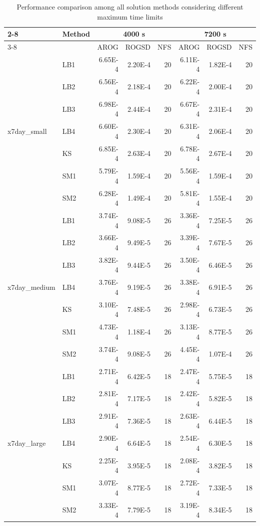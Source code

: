 \begin{table}[htpb]
\centering
\caption{Performance comparison among all solution methods considering different maximum time limits}
\label{tab:descriptive_fused}
\scriptsize
\begin{tabular}{llrrr|rrr}
\toprule
\cmidrule{2-8}
\multicolumn{1}{c}{Set} &Method &\multicolumn{3}{c}{4000 s} & \multicolumn{3}{c}{7200 s}\\
\cmidrule{3-8}
& & AROG & ROGSD & NFS & AROG & ROGSD & NFS \\
\midrule
 \multirow{7}{*}{x7day\_small} & LB1 &6.65E-4 &2.20E-4 &20 &6.11E-4 &1.82E-4 &20 \\
&LB2 &  6.56E-4 &2.18E-4 &20 &6.22E-4 &2.00E-4 &20 \\
&LB3 &  6.98E-4 &2.44E-4 &20 &6.67E-4 &2.31E-4 &20 \\
&LB4 &  6.60E-4 &2.30E-4 &20 &6.31E-4 &2.06E-4 &20 \\
&KS  &  6.85E-4 &2.63E-4 &20 &6.78E-4 &2.67E-4 &20 \\
&SM1 &  5.79E-4 &1.59E-4 &20 &5.56E-4 &1.59E-4 &20 \\
&SM2 &  6.28E-4 &1.49E-4 &20 &5.81E-4 &1.55E-4 &20 \\
\midrule
\multirow{7}{*}{x7day\_medium} &LB1  &3.74E-4 &9.08E-5 &26 &3.36E-4 &7.25E-5 &26 \\
&LB2  &3.66E-4 &9.49E-5 &26 &3.39E-4 &7.67E-5 &26 \\
&LB3  &3.82E-4 &9.44E-5 &26 &3.50E-4 &6.46E-5 &26 \\
&LB4  &3.76E-4 &9.19E-5 &26 &3.38E-4 &6.91E-5 &26 \\
&KS   &3.10E-4 &7.48E-5 &26 &2.98E-4 &6.73E-5 &26 \\
&SM1  &4.73E-4 &1.18E-4 &26 &3.13E-4 &8.77E-5 &26 \\
&SM2  &3.74E-4 &9.08E-5 &26 &4.45E-4 &1.07E-4 &26 \\
\midrule
\multirow{7}{*}{x7day\_large} & LB1  &2.71E-4 &6.42E-5 &18 &2.47E-4 &5.75E-5 &18 \\
&LB2 &  2.81E-4 &7.17E-5 &18 &2.42E-4 &5.82E-5 &18 \\
&LB3 &  2.91E-4 &7.36E-5 &18 &2.63E-4 &6.44E-5 &18 \\
&LB4 &  2.90E-4 &6.64E-5 &18 &2.54E-4 &6.30E-5 &18 \\
&KS  &  2.25E-4 &3.95E-5 &18 &2.08E-4 &3.82E-5 &18 \\
&SM1 &  3.07E-4 &8.77E-5 &18 &2.72E-4 &7.33E-5 &18 \\
&SM2 &  3.33E-4 &7.79E-5 &18 &3.19E-4 &8.34E-5 &18 \\
\bottomrule
\end{tabular}
\end{table}


